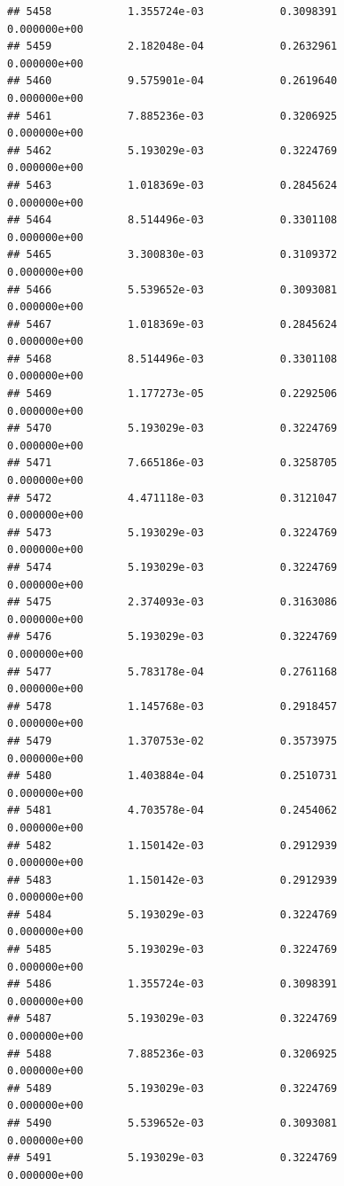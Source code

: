 \documentclass[
]{article}
\begin{document}
\begin{verbatim}
## 5458            1.355724e-03            0.3098391            0.000000e+00
## 5459            2.182048e-04            0.2632961            0.000000e+00
## 5460            9.575901e-04            0.2619640            0.000000e+00
## 5461            7.885236e-03            0.3206925            0.000000e+00
## 5462            5.193029e-03            0.3224769            0.000000e+00
## 5463            1.018369e-03            0.2845624            0.000000e+00
## 5464            8.514496e-03            0.3301108            0.000000e+00
## 5465            3.300830e-03            0.3109372            0.000000e+00
## 5466            5.539652e-03            0.3093081            0.000000e+00
## 5467            1.018369e-03            0.2845624            0.000000e+00
## 5468            8.514496e-03            0.3301108            0.000000e+00
## 5469            1.177273e-05            0.2292506            0.000000e+00
## 5470            5.193029e-03            0.3224769            0.000000e+00
## 5471            7.665186e-03            0.3258705            0.000000e+00
## 5472            4.471118e-03            0.3121047            0.000000e+00
## 5473            5.193029e-03            0.3224769            0.000000e+00
## 5474            5.193029e-03            0.3224769            0.000000e+00
## 5475            2.374093e-03            0.3163086            0.000000e+00
## 5476            5.193029e-03            0.3224769            0.000000e+00
## 5477            5.783178e-04            0.2761168            0.000000e+00
## 5478            1.145768e-03            0.2918457            0.000000e+00
## 5479            1.370753e-02            0.3573975            0.000000e+00
## 5480            1.403884e-04            0.2510731            0.000000e+00
## 5481            4.703578e-04            0.2454062            0.000000e+00
## 5482            1.150142e-03            0.2912939            0.000000e+00
## 5483            1.150142e-03            0.2912939            0.000000e+00
## 5484            5.193029e-03            0.3224769            0.000000e+00
## 5485            5.193029e-03            0.3224769            0.000000e+00
## 5486            1.355724e-03            0.3098391            0.000000e+00
## 5487            5.193029e-03            0.3224769            0.000000e+00
## 5488            7.885236e-03            0.3206925            0.000000e+00
## 5489            5.193029e-03            0.3224769            0.000000e+00
## 5490            5.539652e-03            0.3093081            0.000000e+00
## 5491            5.193029e-03            0.3224769            0.000000e+00

\end{verbatim}
\end{document}
